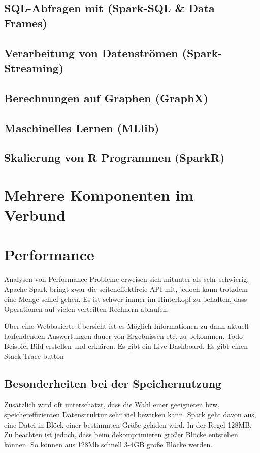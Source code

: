 \subsection{SQL-Abfragen mit (Spark-SQL \& Data Frames)}

\subsection{Verarbeitung von Datenströmen (Spark-Streaming)}

\subsection{Berechnungen auf Graphen (GraphX)}

\subsection{Maschinelles Lernen (MLlib)}

\subsection{Skalierung von R Programmen (SparkR)}\label{sec_sparkr}

\section{Mehrere Komponenten im Verbund}

\newpage
\section{Performance}

Analysen von Performance Probleme erweisen sich mitunter als sehr schwierig. Apache Spark bringt zwar die seiteneffektfreie API mit, jedoch kann trotzdem eine Menge schief gehen. Es ist schwer immer im Hinterkopf zu behalten, dass Operationen auf vielen verteilten Rechnern ablaufen. 


Über eine Webbasierte Übersicht ist es Möglich Informationen zu dann aktuell laufendenden Auswertungen dauer von Ergebnissen etc. zu bekommen. 
Todo Beispiel Bild erstellen und erklären.
Es gibt ein Live-Dashboard.
Es gibt einen Stack-Trace button


\subsection{Besonderheiten bei der Speichernutzung}
Zusätzlich wird oft unterschätzt, dass die Wahl einer geeigneten bzw. speichereffizienten Datenstruktur sehr viel bewirken kann.
Spark geht davon aus, eine Datei in Blöck einer bestimmten Größe geladen wird. In der Regel 128MB. Zu beachten ist jedoch, dass beim dekomprimieren größer Blöcke entstehen können. So können aus 128Mb schnell 3-4GB große Blöcke werden. 

